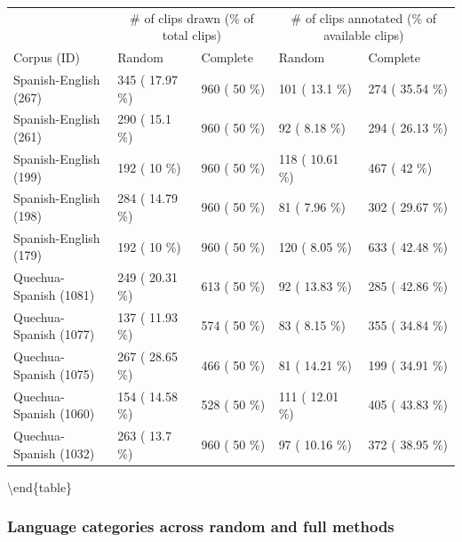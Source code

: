 \documentclass[
]{article}
\begin{document}
\begin{tabular}[t]{lllll}
\toprule
\multicolumn{1}{c}{ } & \multicolumn{2}{c}{\# of clips drawn (\% of total clips)} & \multicolumn{2}{c}{\# of clips annotated (\% of available clips)} \\
\cmidrule(l{3pt}r{3pt}){2-3} \cmidrule(l{3pt}r{3pt}){4-5}
Corpus (ID) & Random & Complete & Random & Complete\\
\midrule
Spanish-English (267) & 345 ( 17.97 \%) & 960 ( 50 \%) & 101 ( 13.1 \%) & 274 ( 35.54 \%)\\
Spanish-English (261) & 290 ( 15.1 \%) & 960 ( 50 \%) & 92 ( 8.18 \%) & 294 ( 26.13 \%)\\
Spanish-English (199) & 192 ( 10 \%) & 960 ( 50 \%) & 118 ( 10.61 \%) & 467 ( 42 \%)\\
Spanish-English (198) & 284 ( 14.79 \%) & 960 ( 50 \%) & 81 ( 7.96 \%) & 302 ( 29.67 \%)\\
Spanish-English (179) & 192 ( 10 \%) & 960 ( 50 \%) & 120 ( 8.05 \%) & 633 ( 42.48 \%)\\
\addlinespace
Quechua-Spanish (1081) & 249 ( 20.31 \%) & 613 ( 50 \%) & 92 ( 13.83 \%) & 285 ( 42.86 \%)\\
Quechua-Spanish (1077) & 137 ( 11.93 \%) & 574 ( 50 \%) & 83 ( 8.15 \%) & 355 ( 34.84 \%)\\
Quechua-Spanish (1075) & 267 ( 28.65 \%) & 466 ( 50 \%) & 81 ( 14.21 \%) & 199 ( 34.91 \%)\\
Quechua-Spanish (1060) & 154 ( 14.58 \%) & 528 ( 50 \%) & 111 ( 12.01 \%) & 405 ( 43.83 \%)\\
Quechua-Spanish (1032) & 263 ( 13.7 \%) & 960 ( 50 \%) & 97 ( 10.16 \%) & 372 ( 38.95 \%)\\
\bottomrule
\end{tabular}

\textbackslash end\{table\}

\hypertarget{language-categories-across-random-and-full-methods}{%
\subsubsection{Language categories across random and full methods}\label{language-categories-across-random-and-full-methods}}
\end{document}
